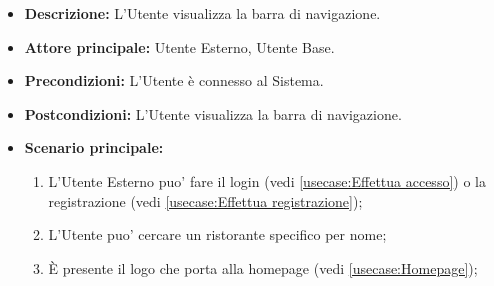 \label{usecase:Barra di navigazione}
\begin{itemize}
    \item \textbf{Descrizione:} L'Utente visualizza la barra di navigazione.

    \item \textbf{Attore principale:} Utente Esterno, Utente Base.

    \item \textbf{Precondizioni:} L'Utente è connesso al Sistema.

    \item \textbf{Postcondizioni:} L'Utente visualizza la barra di navigazione.

    \item \textbf{Scenario principale:}
    \begin{enumerate}
        \item L'Utente Esterno puo' fare il login (vedi \autoref{usecase:Effettua accesso}) o la registrazione (vedi \autoref{usecase:Effettua registrazione});
        \item L'Utente puo' cercare un ristorante specifico per nome;
        \item È presente il logo che porta alla homepage (vedi \autoref{usecase:Homepage});
    \end{enumerate}
\end{itemize}
